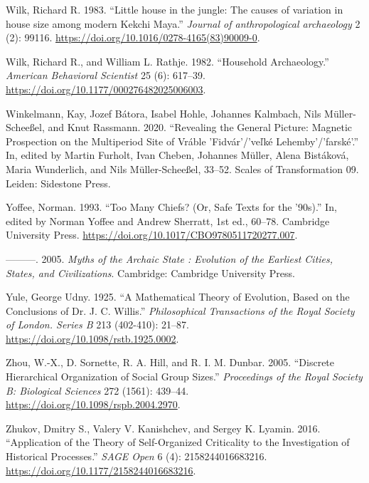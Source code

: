 \documentclass[
  12pt,
  a4paper, twoside]{book}
\newlength{\cslhangindent}
\newlength{\cslentryspacingunit} %
\newenvironment{CSLReferences}[2] %
 {%
  \setlength{\parindent}{0pt}
  \ifodd #1
  \let\oldpar\par
  \def\par{\hangindent=\cslhangindent\oldpar}
  \fi
  \setlength{\parskip}{#2\cslentryspacingunit}
 }%
 {}
\begin{document}
\begin{CSLReferences}{1}{0}
\leavevmode{}%
Wilk, Richard R. 1983. {``Little house in the jungle: The causes of variation in house size among modern Kekchi Maya.''} \emph{Journal of anthropological archaeology} 2 (2): 99116. \url{https://doi.org/10.1016/0278-4165(83)90009-0}.

\leavevmode{}%
Wilk, Richard R., and William L. Rathje. 1982. {``Household Archaeology.''} \emph{American Behavioral Scientist} 25 (6): 617--39. \url{https://doi.org/10.1177/000276482025006003}.

\leavevmode{}%
Winkelmann, Kay, Jozef Bátora, Isabel Hohle, Johannes Kalmbach, Nils Müller-Scheeßel, and Knut Rassmann. 2020. {``Revealing the General Picture: Magnetic Prospection on the Multiperiod Site of Vráble 'Fidvár'/'ve{ľ}ké Lehemby'/'farské'.''} In, edited by Martin Furholt, Ivan Cheben, Johannes Müller, Alena Bistáková, Maria Wunderlich, and Nils Müller-Scheeßel, 33--52. Scales of Transformation 09. Leiden: Sidestone Press.

\leavevmode{}%
Yoffee, Norman. 1993. {``Too Many Chiefs? (Or, Safe Texts for the '90s).''} In, edited by Norman Yoffee and Andrew Sherratt, 1st ed., 60--78. Cambridge University Press. \url{https://doi.org/10.1017/CBO9780511720277.007}.

\leavevmode{}%
---------. 2005. \emph{Myths of the Archaic State : Evolution of the Earliest Cities, States, and Civilizations}. Cambridge: Cambridge University Press.

\leavevmode{}%
Yule, George Udny. 1925. {``A Mathematical Theory of Evolution, Based on the Conclusions of Dr. J. C. Willis.''} \emph{Philosophical Transactions of the Royal Society of London. Series B} 213 (402-410): 21--87. \url{https://doi.org/10.1098/rstb.1925.0002}.

\leavevmode{}%
Zhou, W.-X., D. Sornette, R. A. Hill, and R. I. M. Dunbar. 2005. {``Discrete Hierarchical Organization of Social Group Sizes.''} \emph{Proceedings of the Royal Society B: Biological Sciences} 272 (1561): 439--44. \url{https://doi.org/10.1098/rspb.2004.2970}.

\leavevmode{}%
Zhukov, Dmitry S., Valery V. Kanishchev, and Sergey K. Lyamin. 2016. {``Application of the {Theory} of {Self-Organized Criticality} to the {Investigation} of {Historical Processes}.''} \emph{SAGE Open} 6 (4): 2158244016683216. \url{https://doi.org/10.1177/2158244016683216}.


\end{CSLReferences}
\end{document}
